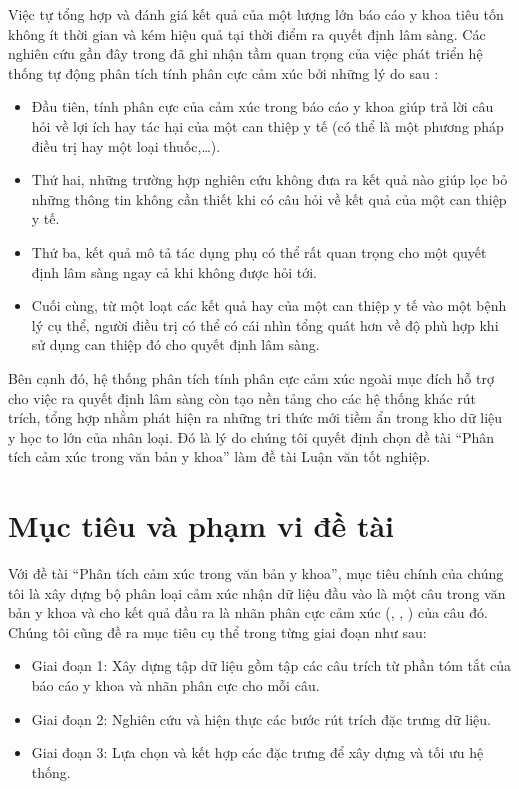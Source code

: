 Việc tự tổng hợp và đánh giá kết quả của một lượng lớn báo cáo y khoa tiêu tốn không ít thời gian và kém hiệu quả tại thời điểm ra quyết định lâm sàng. Các nghiên cứu gần đây trong \cite{medhat2014sentiment} đã ghi nhận tầm quan trọng của việc phát triển hệ thống tự động phân tích tính phân cực cảm xúc bởi những lý do sau \cite{niu2005analysis}: 
\begin{itemize}
\item Đầu tiên, tính phân cực của cảm xúc trong báo cáo y khoa giúp trả lời câu hỏi về lợi ích hay tác hại của một can thiệp y tế (có thể là một phương pháp điều trị hay một loại thuốc,\ldots).
\item Thứ hai, những trường hợp nghiên cứu không đưa ra kết quả nào giúp lọc bỏ những thông tin không cần thiết khi có câu hỏi về kết quả của một can thiệp y tế.
\item Thứ ba, kết quả \tieucuc mô tả tác dụng phụ có thể rất quan trọng cho một quyết định lâm sàng ngay cả khi không được hỏi tới.
\item Cuối cùng, từ một loạt các kết quả \tichcuc hay \tieucuc của một can thiệp y tế vào một bệnh lý cụ thể, người điều trị có thể có cái nhìn tổng quát hơn về độ phù hợp khi sử dụng can thiệp đó cho quyết định lâm sàng.
\end{itemize}

Bên cạnh đó, hệ thống phân tích tính phân cực cảm xúc ngoài mục đích hỗ trợ cho việc ra quyết định lâm sàng còn tạo nền tảng cho các hệ thống khác rút trích, tổng hợp nhằm phát hiện ra những tri thức mới tiềm ẩn trong kho dữ liệu y học to lớn của nhân loại. Đó là lý do chúng tôi quyết định chọn đề tài ``Phân tích cảm xúc trong văn bản y khoa'' làm đề tài Luận văn tốt nghiệp.
\section{Mục tiêu và phạm vi đề tài}
Với đề tài ``Phân tích cảm xúc trong văn bản y khoa'', mục tiêu chính của chúng tôi là xây dựng bộ phân loại cảm xúc nhận dữ liệu đầu vào là một câu trong văn bản y khoa và cho kết quả đầu ra là nhãn phân cực cảm xúc (\tichcuc, \tieucuc, \trungtinh) của câu đó. Chúng tôi cũng đề ra mục tiêu cụ thể trong từng giai đoạn như sau:

\begin{itemize}
\item Giai đoạn 1: Xây dựng tập dữ liệu gồm tập các câu trích từ phần tóm tắt của báo cáo y khoa và nhãn phân cực cho mỗi câu.
\item Giai đoạn 2: Nghiên cứu và hiện thực các bước rút trích đặc trưng dữ liệu.
\item Giai đoạn 3: Lựa chọn và kết hợp các đặc trưng để xây dựng và tối ưu hệ thống.
\end{itemize}

